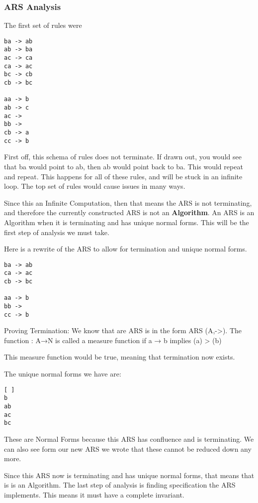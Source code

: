 \documentclass{article}
\theoremstyle{theorem}
\theoremstyle{definition}
\theoremstyle{remark}
\begin{document}
\subsubsection{ARS Analysis}
The first set of rules were
\begin{verbatim}
ba -> ab
ab -> ba
ac -> ca
ca -> ac
bc -> cb
cb -> bc
 
aa -> b
ab -> c
ac ->  
bb ->
cb -> a
cc -> b
\end{verbatim}
First off, this schema of rules does not terminate. If drawn out, you would see that ba would point to ab, then ab would point back to ba. This would repeat and repeat. This happens for all of these rules, and will be stuck in an infinite loop. The top set of rules would cause issues in many ways.

\noindent\newline Since this an Infinite Computation, then that means the ARS is not terminating, and therefore the currently constructed ARS is not an \textbf{Algorithm}. An ARS is an Algorithm when it is terminating and has unique normal forms. This will be the first step of analysis we must take.

\noindent\newline Here is a rewrite of the ARS to allow for termination and unique normal forms.

\begin{verbatim}
ba -> ab
ca -> ac
cb -> bc
 
aa -> b
bb ->
cc -> b
\end{verbatim}

\noindent\newline Proving Termination:
\noindent\newline We know that are ARS is in the form ARS (A,->). The function 
: A→N is called a measure function if a → b implies (a) > (b)


\noindent\newline This measure function would be true, meaning that termination now exists.

\noindent\newline The unique normal forms we have are:
\begin{verbatim}
[ ]
b
ab
ac
bc
\end{verbatim}
\noindent\newline These are Normal Forms because this ARS has confluence and is terminating. We can also see form our new ARS we wrote that these cannot be reduced down any more.

\noindent Since this ARS now is terminating and has unique normal forms, that means that is is an Algorithm. The last step of analysis is finding specification the ARS implements. This means it must have a complete invariant.
\end{document}
